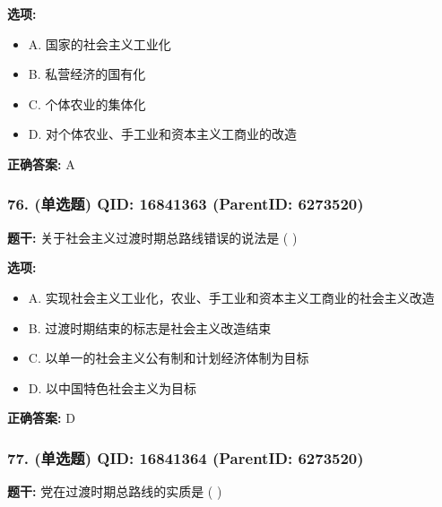 \documentclass[12pt,UTF8]{ctexart}
\begin{document}
\textbf{选项:}
\begin{itemize}[leftmargin=*]

  \item A. 国家的社会主义工业化

  \item B. 私营经济的国有化

  \item C. 个体农业的集体化

  \item D. 对个体农业、手工业和资本主义工商业的改造

\end{itemize}

\textbf{正确答案:}
A

\vspace{0.3em}\hrulefill\vspace{0.7em}

\subsubsection*{76. (单选题) \small QID: 16841363 (ParentID: 6273520)}

\textbf{题干:}
关于社会主义过渡时期总路线错误的说法是 ( )



\textbf{选项:}
\begin{itemize}[leftmargin=*]

  \item A. 实现社会主义工业化，农业、手工业和资本主义工商业的社会主义改造

  \item B. 过渡时期结束的标志是社会主义改造结束

  \item C. 以单一的社会主义公有制和计划经济体制为目标

  \item D. 以中国特色社会主义为目标

\end{itemize}

\textbf{正确答案:}
D

\vspace{0.3em}\hrulefill\vspace{0.7em}

\subsubsection*{77. (单选题) \small QID: 16841364 (ParentID: 6273520)}

\textbf{题干:}
党在过渡时期总路线的实质是 ( )
\end{document}
